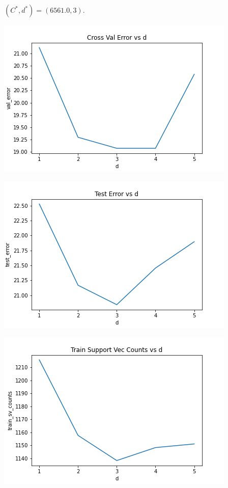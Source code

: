\documentclass{article}
\begin{document}
$(C^*, d^*) = (6561.0, 3)$.

\includegraphics[width=\textwidth]{./images/C4_cross_val_error_vs_d.png}

\includegraphics[width=\textwidth]{./images/C4_test_error_vs_d.png}

\includegraphics[width=\textwidth]{./images/C4_train_sv_counts.png}
\end{document}
